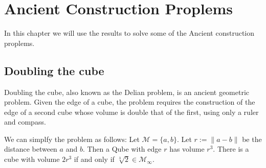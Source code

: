 \chapter{Ancient Construction Proplems}
In this chapter we will use the results to solve some of the Ancient construction proplems.

\section{Doubling the cube}
Doubling the cube, also known as the Delian problem, is an ancient geometric problem.
Given the edge of a cube, the problem requires the construction of the edge of a second cube whose volume is double that of the first,
using only a ruler and compass.

We can simplfy the problem as follows:
Let $\mathcal{M} = \{a, b\}$. Let $r := \|a - b\|$ be the distance between $a$ and $b$. Then a Qube with edge $r$ has volume $r^3$.
There is a cube with volume $2r^3$ if and only if $\sqrt[3]{2} \in \mathcal{M}_{\infty}$.


